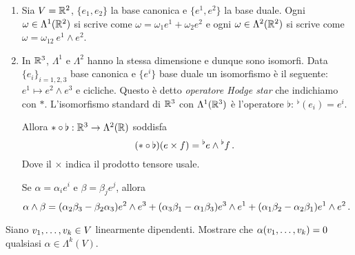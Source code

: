 \begin{example}
	\begin{enumerate}
		\item Sia $V = \R^2$, $\{e_1,e_2\}$ la base canonica e $\{e^1,e^2\}$ la base duale. Ogni $\omega\in\Lambda^1(\R^2)$ si scrive come $\omega = \omega_1e^1+\omega_2e^2$ e ogni $\omega\in\Lambda^2(\R^2)$ si scrive come $\omega = \omega_{12}\ e^1\wedge e^2$. 
		
		\item In $\R^3$, $\Lambda^1$ e $\Lambda^2$ hanno la stessa dimensione e dunque sono isomorfi. Data $\{e_i\}_{i=1,2,3}$ base canonica e $\{e^i\}$ base duale un isomorfismo è il seguente: $e^1\mapsto e^2\wedge e^3$ e cicliche.
		Questo è detto \emph{operatore Hodge star} che indichiamo con $*$. L'isomorfismo standard di $\R^3$ con $\Lambda^1(\R^3)$ è l'operatore $\flat$: $^\flat(e_i) = e^i$.
		
		Allora $*\circ \flat:\R^3\to \Lambda^2(\R)$ soddisfa
		\begin{equation*}
			(*\circ \flat) (e\times f) = {^\flat e} \wedge {^\flat f}\punto 
		\end{equation*}
		Dove il $\times$ indica il prodotto tensore usale.
		
		Se $\alpha = \alpha_ie^i$ e $\beta = \beta_j e^j$, allora
		\begin{equation*}
			\alpha\wedge\beta = (\alpha_2\beta_3 - \beta_2\alpha_3)e^2\wedge e^3 + (\alpha_3\beta_1 - \alpha_1\beta_3)e^3\wedge e^1 + (\alpha_1\beta_2 - \alpha_2\beta_1) e^1\wedge e^2 \punto
		\end{equation*}
	\end{enumerate}
\end{example}

\begin{exercise}
	Siano $\seqb vk, \in V$ linearmente dipendenti. Mostrare che $\alpha(\seqb vk,) = 0$ qualsiasi $\alpha\in\Lambda^k(V)$. 
\end{exercise}


